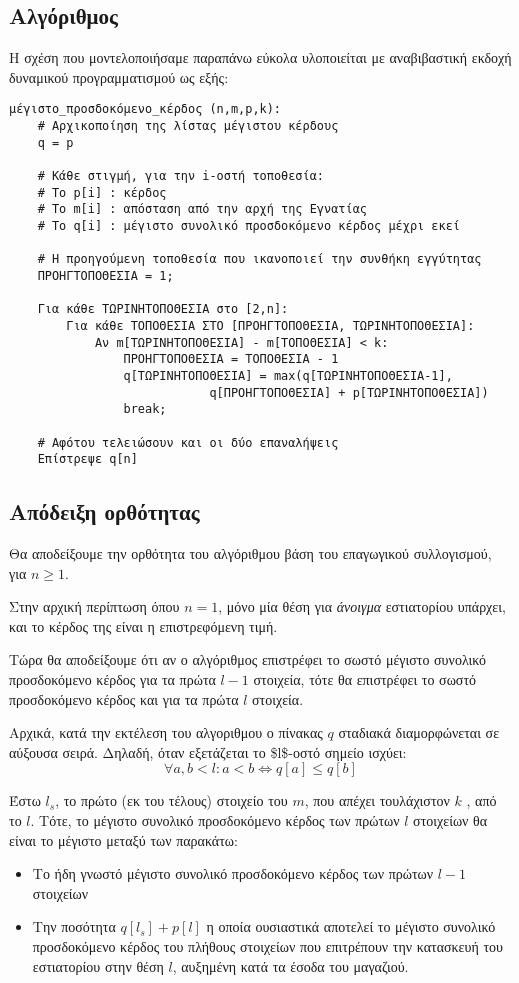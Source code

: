 \documentclass[11pt]{article}
\begin{document}
\subsection{Αλγόριθμος}
\label{sec:org851ef11}
Η σχέση που μοντελοποιήσαμε παραπάνω εύκολα υλοποιείται με αναβιβαστική εκδοχή
δυναμικού προγραμματισμού ως εξής:
\begin{verbatim}
μέγιστο_προσδοκόμενο_κέρδος (n,m,p,k):
    # Αρχικοποίηση της λίστας μέγιστου κέρδους
    q = p

    # Κάθε στιγμή, για την i-οστή τοποθεσία:
    # Το p[i] : κέρδος
    # Το m[i] : απόσταση από την αρχή της Εγνατίας
    # Το q[i] : μέγιστο συνολικό προσδοκόμενο κέρδος μέχρι εκεί

    # Η προηγούμενη τοποθεσία που ικανοποιεί την συνθήκη εγγύτητας
    ΠΡΟΗΓΤΟΠΟΘΕΣΙΑ = 1;

    Για κάθε ΤΩΡΙΝΗΤΟΠΟΘΕΣΙΑ στο [2,n]:
        Για κάθε ΤΟΠΟΘΕΣΙΑ ΣΤΟ [ΠΡΟΗΓΤΟΠΟΘΕΣΙΑ, ΤΩΡΙΝΗΤΟΠΟΘΕΣΙΑ]:
            Αν m[ΤΩΡΙΝΗΤΟΠΟΘΕΣΙΑ] - m[ΤΟΠΟΘΕΣΙΑ] < k:
                ΠΡΟΗΓΤΟΠΟΘΕΣΙΑ = ΤΟΠΟΘΕΣΙΑ - 1 
                q[ΤΩΡΙΝΗΤΟΠΟΘΕΣΙΑ] = max(q[ΤΩΡΙΝΗΤΟΠΟΘΕΣΙΑ-1],
                            q[ΠΡΟΗΓΤΟΠΟΘΕΣΙΑ] + p[ΤΩΡΙΝΗΤΟΠΟΘΕΣΙΑ])
                break;

    # Αφότου τελειώσουν και οι δύο επαναλήψεις        
    Επίστρεψε q[n]
\end{verbatim}
\subsection{Απόδειξη ορθότητας}
\label{sec:org949d100}
Θα αποδείξουμε την ορθότητα του αλγόριθμου βάση του επαγωγικού συλλογισμού, για
\(n\geq 1\).

Στην αρχική περίπτωση όπου \(n = 1\), μόνο μία θέση για \emph{άνοιγμα} εστιατορίου
υπάρχει, και το κέρδος της είναι η επιστρεφόμενη τιμή.

Τώρα θα αποδείξουμε ότι αν ο αλγόριθμος επιστρέφει το σωστό μέγιστο συνολικό
προσδοκόμενο κέρδος για τα πρώτα \(l-1\) στοιχεία, τότε θα επιστρέφει το σωστό
προσδοκόμενο κέρδος και για τα πρώτα \(l\) στοιχεία.

Αρχικά, κατά την εκτέλεση του αλγοριθμου ο πίνακας \(q\) σταδιακά διαμορφώνεται σε
αύξουσα σειρά. Δηλαδή, όταν εξετάζεται το \$l\$-οστό σημείο ισχύει:
\begin{equation}
\label{eq:3}
\forall a,b < l: a < b \iff q[a] \leq q[b]
\end{equation}

Έστω \(l_s\), το πρώτο (εκ του τέλους) στοιχείο του \(m\), που απέχει τουλάχιστον
\(k\) , από το \(l\). Τότε, το μέγιστο συνολικό προσδοκόμενο κέρδος των πρώτων \(l\)
στοιχείων θα είναι το μέγιστο μεταξύ των παρακάτω:
\begin{itemize}
\item Το ήδη γνωστό μέγιστο συνολικό προσδοκόμενο κέρδος των πρώτων \(l-1\) στοιχείων
\item Την ποσότητα \(q[l_s] + p[l]\) η οποία ουσιαστικά αποτελεί το μέγιστο συνολικό
προσδοκόμενο κέρδος του πλήθους στοιχείων που επιτρέπουν την κατασκευή του
εστιατορίου στην θέση \(l\), αυξημένη κατά τα έσοδα του μαγαζιού.
\end{itemize}
\end{document}
